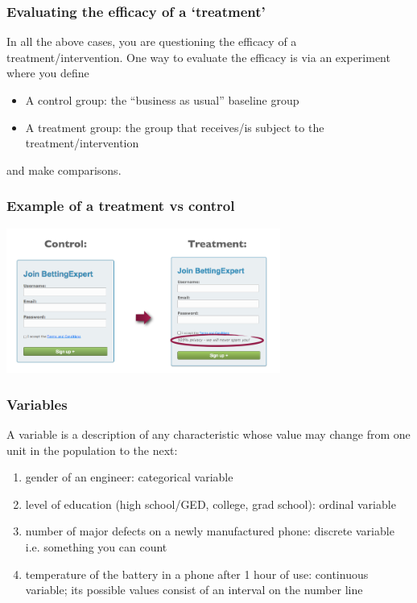 \documentclass[slides]{beamer}\usepackage[]{graphicx}\usepackage[]{color}
\newcommand{\blue}[1]{\textcolor{blue2}{#1}}
\begin{document}
\begin{frame}
\frametitle{Evaluating the efficacy of a `treatment'}
In all the above cases, you are questioning the efficacy of a \blue{treatment/intervention}.  One way to evaluate the efficacy is via an \blue{experiment} where you define
\begin{itemize}
\pause\item A \blue{control} group: the ``business as usual'' baseline group
\pause\item A \blue{treatment} group:  the group that receives/is subject to the treatment/intervention
\end{itemize}
\pause and make comparisons.

\end{frame}



\begin{frame}
\frametitle{Example of a treatment vs control}
\begin{center}
\includegraphics[width=9cm]{figure/control_treatment.png}
\end{center}
\end{frame}



\begin{frame}
\frametitle{Variables}
A \blue{variable} is a description of any characteristic whose value may change from one unit in the population to the next:
\begin{enumerate}
\pause\item gender of an engineer:  \blue{categorical} variable
\pause\item level of education (high school/GED, college, grad school): \blue{ordinal} variable
\pause\item number of major defects on a newly manufactured phone: \blue{discrete} variable i.e. something you can count
\pause\item temperature of the battery in a phone after 1 hour of use: \blue{continuous} variable; its possible values consist of an interval on the number line
\end{enumerate}

\end{frame}
\end{document}
